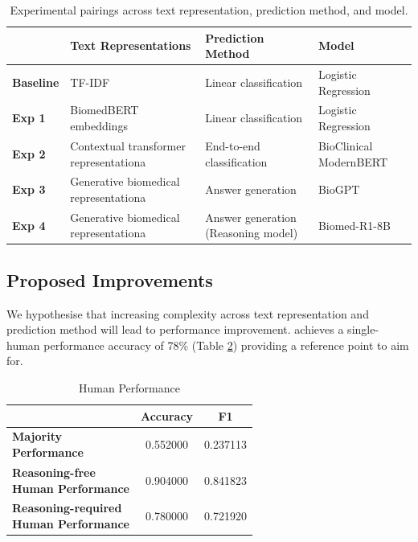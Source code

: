 \documentclass[11pt]{article}
\begin{document}
\begin{table}[htbp]
\centering
\footnotesize
\setlength{\tabcolsep}{4pt}
\renewcommand{\arraystretch}{1.1}

\begin{tabularx}{\columnwidth}{|l|X|X|X|}
\hline
\textbf{} & \textbf{Text Representations} & \textbf{Prediction Method} & \textbf{Model} \\
\hline
\textbf{Baseline} & TF-IDF & Linear classification & Logistic Regression \\
\hline
\textbf{Exp 1} & BiomedBERT embeddings & Linear classification & Logistic Regression \\
\hline
\textbf{Exp 2} & Contextual transformer representationa & End-to-end classification & BioClinical ModernBERT \\
\hline
\textbf{Exp 3} & Generative biomedical representationa & Answer generation & BioGPT \\
\hline
\textbf{Exp 4} & Generative biomedical representationa & Answer generation (Reasoning model) & Biomed-R1-8B \\
\hline
\end{tabularx}

\caption{Experimental pairings across text representation, prediction method, and model.}
\label{table:1}
\end{table}


\subsection{Proposed Improvements}
We hypothesise that increasing complexity across text representation and prediction method will lead to performance improvement. \citet{jin_pubmedqa_2019} achieves a single-human performance accuracy of 78\% (Table \ref{table:2}) providing a reference point to aim for. \par

\begin{table}[htbp]
\small
\centering
\begin{tabular}{|l|c|c|}
\hline
& \textbf{Accuracy} & \textbf{F1} \\
\hline
\makecell{\textbf{Majority}\\\textbf{Performance}} & 0.552000 & 0.237113 \\
\hline
\makecell{\textbf{Reasoning-free}\\\textbf{Human Performance}} & 0.904000 & 0.841823 \\
\hline
\makecell{\textbf{Reasoning-required}\\\textbf{Human Performance}} & 0.780000 & 0.721920 \\
\hline
\end{tabular}
\caption{Human Performance}
\label{table:2}
\end{table}
\end{document}
